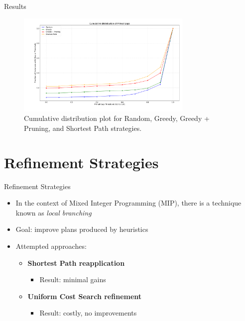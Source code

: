 \documentclass[aspectratio=169,xcolor=dvipsnames]{beamer}
\begin{document}

\begin{frame}{Results}
	\begin{figure}[ht]
		\centering
		\includegraphics[width=0.75\textwidth]{../thesis/images/algs0124.png}
		\caption{Cumulative distribution plot for Random, Greedy, Greedy + Pruning, and Shortest Path strategies.}
		\label{fig:rgps}
	\end{figure}
\end{frame}

\section{Refinement Strategies}

\begin{frame}{Refinement Strategies}
	\begin{itemize}
		\item In the context of Mixed Integer Programming (MIP), there is a technique known as \textit{local branching}
		\item Goal: improve plans produced by heuristics
		\item Attempted approaches:
		      \begin{itemize}
			      \item \textbf{Shortest Path reapplication}
			            \begin{itemize}
				            \item Result: minimal gains
			            \end{itemize}
			      \item \textbf{Uniform Cost Search refinement}
			            \begin{itemize}
				            \item Result: costly, no improvements
			            \end{itemize}

		      \end{itemize}
	\end{itemize}
\end{frame}
\end{document}
